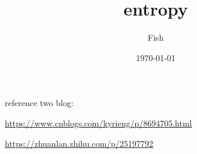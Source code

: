 \documentclass[12pt]{ctexart}%
\title{\kaishu entropy}
\author{Fish}
\date{\today}
\begin{document}
	\maketitle
	\renewcommand{\contentsname}{Content} %
	\tableofcontents
	\clearpage
	\pagestyle{fancy}
	
	reference two blog:
	
	\qquad	\url{https://www.cnblogs.com/kyrieng/p/8694705.html}
	
	\qquad  \url{https://zhuanlan.zhihu.com/p/25197792}
\end{document}
